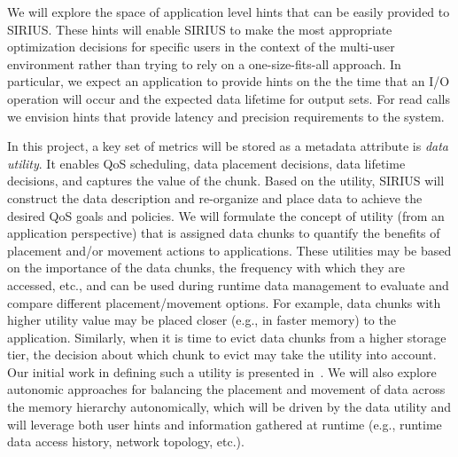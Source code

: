 We will explore the space of application level hints that can be easily provided
to SIRIUS. These hints will enable SIRIUS to make the
most appropriate optimization decisions for specific users in the context of the
multi-user environment rather than trying to rely on a one-size-fits-all
approach. In particular, we expect an application to provide hints on the
the time that an I/O operation will occur and
the expected data lifetime for output sets. For read calls we envision
hints that provide latency and precision requirements to the system. 

In this project, a key set of metrics will be stored as a metadata
attribute is \textit{data utility}.  It enables QoS scheduling, data placement
decisions, data lifetime decisions, and captures the value of the chunk.
Based on the utility, SIRIUS will construct the data description and re-organize and place data to
achieve the desired QoS goals and policies.
 We will formulate the concept of utility (from an
application perspective) that is assigned data chunks to quantify the
benefits of placement and/or movement actions to applications. These
utilities may be based on the importance of the data chunks, the frequency
with which they are accessed, etc., and can be used during runtime data
management to evaluate and compare different placement/movement options. 
For example, data chunks with higher utility value may be
placed closer (e.g., in faster memory) to the application.
Similarly, when it is time to evict data chunks from a higher storage
tier, the decision about which chunk to evict may take the utility into
account. Our initial work in defining such a utility is presented in~\cite{tongipdps15}.
 We will also explore autonomic approaches for balancing the placement and 
 movement of data across the memory hierarchy autonomically, which will be driven 
 by the data utility and will leverage both user hints and information gathered at runtime (e.g., runtime data access
history, network topology, etc.).

